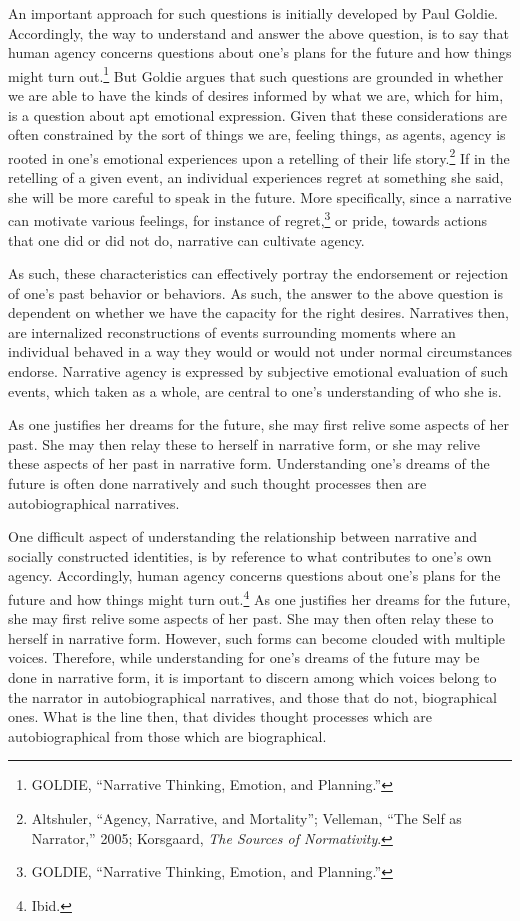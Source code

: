 \documentclass[
  12pt,
]{book}
\theoremstyle{definition}
\theoremstyle{definition}
\theoremstyle{definition}
\theoremstyle{definition}
\theoremstyle{remark}
\begin{document}
An important approach for such questions is initially developed by Paul Goldie. Accordingly, the way to understand and answer the above question, is to say that human agency concerns questions about one's plans for the future and how things might turn out.\footnote{GOLDIE, {``Narrative {Thinking}, {Emotion}, and {Planning}.''}} But Goldie argues that such questions are grounded in whether we are able to have the kinds of desires informed by what we are, which for him, is a question about apt emotional expression. Given that these considerations are often constrained by the sort of things we are, feeling things, as agents, agency is rooted in one's emotional experiences upon a retelling of their life story.\footnote{Altshuler, {``Agency, Narrative, and Mortality''}; Velleman, {``The {Self} as {Narrator},''} 2005; Korsgaard, \emph{The Sources of Normativity}.} If in the retelling of a given event, an individual experiences regret at something she said, she will be more careful to speak in the future. More specifically, since a narrative can motivate various feelings, for instance of regret,\footnote{GOLDIE, {``Narrative {Thinking}, {Emotion}, and {Planning}.''}} or pride, towards actions that one did or did not do, narrative can cultivate agency.

As such, these characteristics can effectively portray the endorsement or rejection of one's past behavior or behaviors. As such, the answer to the above question is dependent on whether we have the capacity for the right desires. Narratives then, are internalized reconstructions of events surrounding moments where an individual behaved in a way they would or would not under normal circumstances endorse. Narrative agency is expressed by subjective emotional evaluation of such events, which taken as a whole, are central to one's understanding of who she is.

As one justifies her dreams for the future, she may first relive some aspects of her past. She may then relay these to herself in narrative form, or she may relive these aspects of her past in narrative form. Understanding one's dreams of the future is often done narratively and such thought processes then are autobiographical narratives.

One difficult aspect of understanding the relationship between narrative and socially constructed identities, is by reference to what contributes to one's own agency. Accordingly, human agency concerns questions about one's plans for the future and how things might turn out.\footnote{Ibid.} As one justifies her dreams for the future, she may first relive some aspects of her past. She may then often relay these to herself in narrative form. However, such forms can become clouded with multiple voices. Therefore, while understanding for one's dreams of the future may be done in narrative form, it is important to discern among which voices belong to the narrator in autobiographical narratives, and those that do not, biographical ones. What is the line then, that divides thought processes which are autobiographical from those which are biographical.
\end{document}
